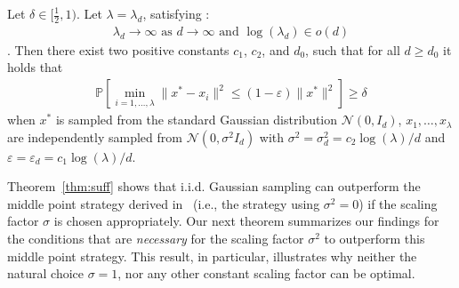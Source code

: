 \begin{thm}
\label{thm:suff}
Let $\delta\in[\frac12,1)$. 
Let $\lambda=\lambda_d$, satisfying :
\begin{align}
\label{ass3b}
\lambda_d\to\infty \text{ as } d\to\infty \text{ and } \log(\lambda_d)\in o(d)
\end{align}.
Then there exist two positive constants $c_1$, $c_2$, and $d_0$, such that for all $d\geq d_0$ it holds that
\begin{align}
\label{eq:betterdelta}
\mathbb{P}\left[\min_{i=1,\ldots,\lambda}\lVert x^*-x_i\rVert^2 \leq \left(1-\varepsilon\right)\lVert x^*\rVert^2\right]\geq \delta\end{align}
when $x^*$ is sampled from the standard Gaussian distribution $\mathcal{N}(0,I_d)$, 
$x_1,\ldots, x_{\lambda}$ are independently sampled from $\mathcal{N}(0,\sigma^2 I_d)$ with $\sigma^2 = \sigma^2_d=c_2 \log(\lambda)/d$ and 
$\varepsilon=\varepsilon_d=c_1 \log(\lambda)/d$. 
\end{thm}
Theorem~\ref{thm:suff} shows that i.i.d. Gaussian sampling can outperform the middle point strategy derived in~\cite{icmldoe} (i.e., the strategy using $\sigma^2=0$) if the scaling factor $\sigma$ is chosen appropriately. Our next theorem summarizes our findings for the conditions that are \textit{necessary} for the scaling factor $\sigma^2$ to outperform this middle point strategy. This result, in particular, illustrates why neither the natural choice $\sigma=1$, nor any other constant scaling factor can be optimal.
